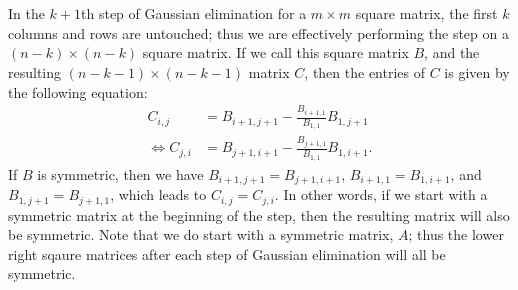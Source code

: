 \documentclass[11pt]{article}
\begin{document}
\maketitle
\section{}
\subsection{}
In the $k+1$th step of Gaussian elimination for a $m\times m$ square matrix, the first $k$ columns and rows are untouched; thus we are effectively performing the step on a $(n-k)\times(n-k)$ square matrix. If we call this square matrix $B$, and the resulting $(n-k-1)\times(n-k-1)$ matrix $C$, then the entries of $C$ is given by the following equation:
\begin{equation}\begin{split} 
C_{i,j}&=B_{i+1,j+1}-\frac{B_{i+1,1}}{B_{1,1}}B_{1,j+1}\\
\Leftrightarrow C_{j,i} &= B_{j+1,i+1} - \frac{B_{j+1,1}}{B_{1,1}}B_{1,i+1}.
\end{split}\nonumber\end{equation} 
If $B$ is symmetric, then we have $B_{i+1,j+1} = B_{j+1,i+1}$, $B_{i+1,1} = B_{1,i+1}$, and $B_{1,j+1} = B_{j+1,1}$, which leads to $C_{i,j} = C_{j,i}$. In other words, if we start with a symmetric matrix at the beginning of the step, then the resulting matrix will also be symmetric. Note that we do start with a symmetric matrix, $A$; thus the lower right sqaure matrices after each step of Gaussian elimination will all be symmetric.
\end{document}
